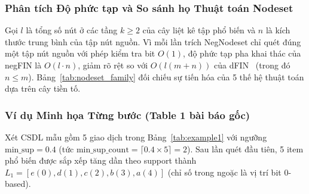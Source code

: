 \documentclass[conference]{IEEEtran}
\begin{document}
\subsubsection{Phân tích Độ phức tạp và So sánh họ Thuật toán Nodeset}
Gọi $l$ là tổng số nút ở các tầng $k \ge 2$ của cây liệt kê tập phổ biến và $n$ là kích thước trung bình của tập nút nguồn. Vì mỗi lần trích NegNodeset chỉ quét đúng một tập nút nguồn với phép kiểm tra bit $O(1)$, độ phức tạp pha khai thác của negFIN là $O(l \cdot n)$, giảm rõ rệt so với $O(l(m+n))$ của dFIN~\cite{b8} (trong đó $n \le m$). Bảng~\ref{tab:nodeset_family} đối chiếu sự tiến hóa của 5 thế hệ thuật toán dựa trên cây tiền tố.

\begin{table}[htbp]
\caption{So sánh 5 thế hệ thuật toán khai thác tập phổ biến dựa trên cấu trúc cây tiền tố}
\label{tab:nodeset_family}
\centering
{}
\end{table}

\subsubsection{Ví dụ Minh họa Từng bước (Table 1 bài báo gốc)}
Xét CSDL mẫu gồm 5 giao dịch trong Bảng~\ref{tab:example1} với ngưỡng $\text{min\_sup} = 0.4$ (tức $\text{min\_sup\_count} = \lceil 0.4 \times 5 \rceil = 2$). Sau lần quét đầu tiên, 5 item phổ biến được sắp xếp tăng dần theo support thành $L_1 = [e(0), d(1), c(2), b(3), a(4)]$ (chỉ số trong ngoặc là vị trí bit 0-based).
\end{document}
